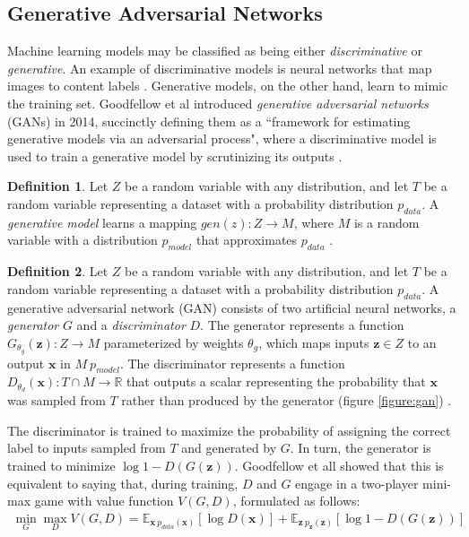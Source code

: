 \documentclass[12pt, titlepage]{report}
\theoremstyle{definition}
\newtheorem{definition}{Definition}
\begin{document}
\subsection{Generative Adversarial Networks}\label{subsection:generativeadversarial}
Machine learning models may be classified as being either \textit{discriminative} or \textit{generative}. An example of discriminative models is neural networks that map images to content labels \cite[p. 1]{goodfellow2014generative}. Generative models, on the other hand, learn to mimic the training set. Goodfellow et al introduced \emph{generative adversarial networks} (GANs) in 2014, succinctly defining them as a ``framework for estimating generative models via an adversarial process", where a discriminative model is used to train a generative model by scrutinizing its outputs \cite[p. 1]{goodfellow2014generative}.

\begin{definition}
Let $Z$ be a random variable with any distribution, and let $T$ be a random variable representing a dataset with a probability distribution $p_{data}$. A \emph{generative model} learns a mapping $gen(z) : Z \rightarrow M$, where $M$ is a random variable with a distribution $p_{model}$ that approximates $p_{data}$ \cite{goodfellow2016nips}.
\end{definition}

\begin{definition}
Let $Z$ be a random variable with any distribution, and let $T$ be a random variable representing a dataset with a probability distribution $p_{data}$. A generative adversarial network (GAN) consists of two artificial neural networks, a \emph{generator} $G$ and a \emph{discriminator} $D$. The generator represents a function $G_{\theta_{g}}(\bm{z}) : Z \rightarrow M$ parameterized by weights $\theta_g$, which maps inputs $\bm{z} \in Z$ to an output $\bm{x}$ in $M ~ p_{model}$. The discriminator represents a function $D_{\theta_d}(\bm{x}) : T \cap M \rightarrow \mathbb{R}$ that outputs a scalar representing the probability that $\bm{x}$ was sampled from $T$ rather than produced by the generator (figure \ref{figure:gan}) \cite[p. 2-3]{goodfellow2014generative}.

The discriminator is trained to maximize the probability of assigning the correct label to inputs sampled from $T$ and generated by $G$. In turn, the generator is trained to minimize $\log{1 - D(G(\bm{z}))}$. Goodfellow et all \cite[p. 3]{goodfellow2014generative} showed that this is equivalent to saying that, during training, $D$ and $G$ engage in a two-player mini-max game with value function $V(G, D)$, formulated as follows:
\begin{gather}\label{eq:gan_train}
\min_G{\max_D{V(G, D)}} = \mathbb{E}_{\bm{x}~p_{data}(\bm{x})}[\log{D(\bm{x})}] + \mathbb{E}_{\bm{z}~p_{\bm{z}}(\bm{z})}[\log{1 - D(G(\bm{z}))}]
\end{gather}
\end{definition}
\end{document}
